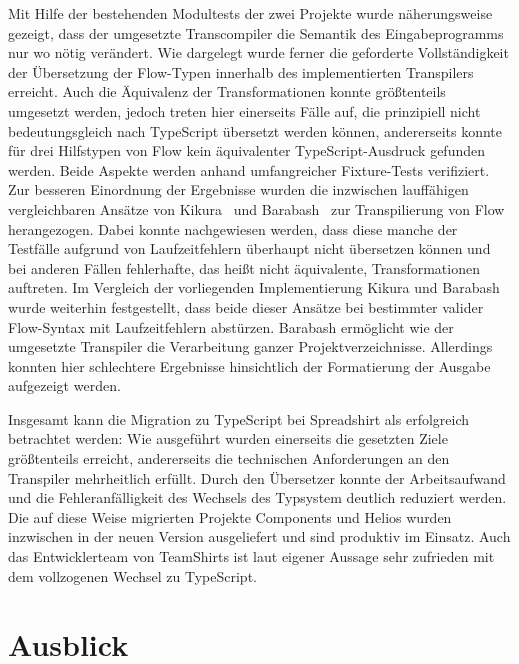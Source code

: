 Mit Hilfe der bestehenden Modultests der zwei Projekte wurde näherungsweise gezeigt, dass der umgesetzte Transcompiler die Semantik des Eingabeprogramms nur wo nötig verändert. Wie dargelegt wurde ferner die geforderte Vollständigkeit der Übersetzung der Flow-Typen innerhalb des implementierten Transpilers erreicht. Auch die Äquivalenz der Transformationen konnte größtenteils umgesetzt werden, jedoch treten hier einerseits Fälle auf, die prinzipiell nicht bedeutungsgleich nach TypeScript übersetzt werden können, andererseits konnte für drei Hilfstypen von Flow kein äquivalenter TypeScript-Ausdruck gefunden werden. Beide Aspekte werden anhand umfangreicher Fixture-Tests verifiziert. Zur besseren Einordnung der Ergebnisse wurden die inzwischen lauffähigen vergleichbaren Ansätze von Kikura~\autocite{KIKURA:FLOW_TO_TS} und Barabash~\autocite{BARABASH:FLOW_TO_TS} zur Transpilierung von Flow herangezogen. Dabei konnte nachgewiesen werden, dass diese manche der Testfälle aufgrund von Laufzeitfehlern überhaupt nicht übersetzen können und bei anderen Fällen fehlerhafte, das heißt nicht äquivalente, Transformationen auftreten.
Im Vergleich der vorliegenden Implementierung Kikura und Barabash wurde weiterhin festgestellt, dass beide dieser Ansätze bei bestimmter valider Flow-Syntax mit Laufzeitfehlern abstürzen. Barabash ermöglicht wie der umgesetzte Transpiler die Verarbeitung ganzer Projektverzeichnisse. Allerdings konnten hier schlechtere Ergebnisse hinsichtlich der Formatierung der Ausgabe aufgezeigt werden.

Insgesamt kann die Migration zu TypeScript bei Spreadshirt als erfolgreich betrachtet werden: Wie ausgeführt wurden einerseits die gesetzten Ziele größtenteils erreicht, andererseits die technischen Anforderungen an den Transpiler mehrheitlich erfüllt. Durch den Übersetzer konnte der Arbeitsaufwand und die Fehleranfälligkeit des Wechsels des Typsystem deutlich reduziert werden.
Die auf diese Weise migrierten Projekte Components und Helios wurden inzwischen in der neuen Version ausgeliefert und sind produktiv im Einsatz. Auch das Entwicklerteam von TeamShirts ist laut eigener Aussage sehr zufrieden mit dem vollzogenen Wechsel zu TypeScript.

\section{Ausblick}

